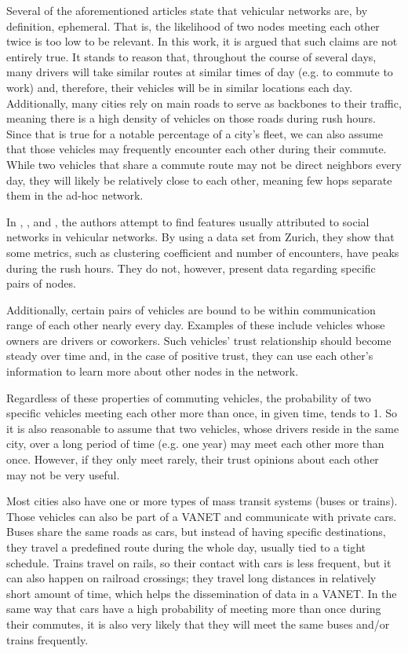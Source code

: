 \documentclass{article}
\begin{document}
Several of the aforementioned articles state that vehicular networks are, by definition, ephemeral.
That is, the likelihood of two nodes meeting each other twice is too low to be relevant.
In this work, it is argued that such claims are not entirely true.
It stands to reason that, throughout the course of several days, many drivers will take similar routes at similar times of day (e.g. to commute to work) and, therefore, their vehicles will be in similar locations each day.
Additionally, many cities rely on main roads to serve as backbones to their traffic, meaning there is a high density of vehicles on those roads during rush hours.
Since that is true for a notable percentage of a city's fleet, we can also assume that those vehicles may frequently encounter each other during their commute.
While two vehicles that share a commute route may not be direct neighbors every day, they will likely be relatively close to each other, meaning few hops separate them in the ad-hoc network.


In \cite{da2013effective}, \cite{cunha2014vehicular}, and \cite{cunha2014possible}, the authors attempt to find features usually attributed to social networks in vehicular networks.
By using a data set from Zurich, they show that some metrics, such as clustering coefficient and number of encounters, have peaks during the rush hours.
They do not, however, present data regarding specific pairs of nodes.

Additionally, certain pairs of vehicles are bound to be within communication range of each other nearly every day.
Examples of these include vehicles whose owners are drivers or coworkers.
Such vehicles' trust relationship should become steady over time and, in the case of positive trust, they can use each other's information to learn more about other nodes in the network.

Regardless of these properties of commuting vehicles, the probability of two specific vehicles meeting each other more than once, in given time, tends to 1.
So it is also reasonable to assume that two vehicles, whose drivers reside in the same city, over a long period of time (e.g. one year) may meet each other more than once.
However, if they only meet rarely, their trust opinions about each other may not be very useful.

Most cities also have one or more types of mass transit systems (buses or trains).
Those vehicles can also be part of a VANET and communicate with private cars.
Buses share the same roads as cars, but instead of having specific destinations, they travel a predefined route during the whole day, usually tied to a tight schedule.
Trains travel on rails, so their contact with cars is less frequent, but it can also happen on railroad crossings; they travel long distances in relatively short amount of time, which helps the dissemination of data in a VANET.
In the same way that cars have a high probability of meeting more than once during their commutes, it is also very likely that they will meet the same buses and/or trains frequently.
\end{document}
